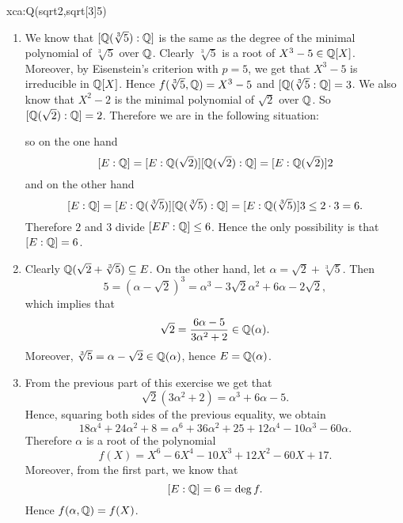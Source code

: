 \begin{sol}{xca:Q(sqrt2,sqrt[3]5)}\
    \begin{enumerate}
        \item      
        We know that $[\mathbb{Q}(\sqrt[3]{5}):\mathbb{Q}]$ is the same as
    the degree of the minimal polynomial of $\sqrt[3]{5}$
    over $\mathbb{Q}$.
    Clearly $\sqrt[3]{5}$ is a root of $X^3-5\in\mathbb{Q}[X]$.
    Moreover, by Eisenstein's criterion with
    $p=5$, we get that $X^3-5$ is irreducible in $\mathbb{Q}[X]$.
    Hence $f(\sqrt[3]{5},\mathbb{Q})=X^3-5$ and $[\mathbb{Q}(\sqrt[3]{5}:\mathbb{Q}]=3$.
    We also know that $X^2-2$ is the minimal polynomial of $\sqrt{2}$ over $\mathbb{Q}$. 
    So $[\mathbb{Q}(\sqrt{2}):\mathbb{Q}]=2$.
    Therefore we are in the following situation:
    \
    \begin{center}
    \end{center}
    so on the one hand
    \[
    [E:\mathbb{Q}]=[E:\mathbb{Q}(\sqrt{2})][\mathbb{Q}(\sqrt{2}):\mathbb{Q}]=[E:\mathbb{Q}(\sqrt{2})]2
    \]
    and on the other hand
    \[
    [E:\mathbb{Q}]=[E:\mathbb{Q}(\sqrt[3]{5})][\mathbb{Q}(\sqrt[3]{5}):\mathbb{Q}]=[E:\mathbb{Q}(\sqrt[3]{5})]3\leq 2\cdot 3=6.
    \]
    Therefore $2$ and $3$ divide $[EF:\mathbb{Q}]\leq 6$.
    Hence the only possibility is that $[E:\mathbb{Q}]=6$.
    \item Clearly $\mathbb{Q}(\sqrt{2}+\sqrt[3]{5})\subseteq E$.
    On the other hand, let $\alpha=\sqrt{2}+\sqrt[3]{5}$.
    Then 
    \[
    5=(\alpha-\sqrt{2})^3=\alpha^3-3\sqrt{2}\alpha^2+6\alpha-2\sqrt{2},
    \]
    which implies that 
    \[
    \sqrt{2}=\frac{6\alpha-5}{3\alpha^2+2}\in\mathbb{Q}(\alpha).
    \]
    Moreover, $\sqrt[3]{5}=\alpha-\sqrt{2}\in\mathbb{Q}(\alpha)$, hence $E=\mathbb{Q}(\alpha)$.
    \item From the previous part of this exercise
    we get that 
    \[
    \sqrt{2}(3\alpha^2+2)=\alpha^3+6\alpha-5.
    \]
    Hence, squaring both sides of the previous equality,
    we obtain
    \[
    18\alpha^4+24\alpha^2+8=\alpha^6+36\alpha^2+25+12\alpha^4-10\alpha^3-60\alpha.
    \]
    Therefore $\alpha$ is a root of the 
    polynomial 
    \[
    f(X)=X^6-6X^4-10X^3+12X^2-60X+17.
    \]
    Moreover, from the first part, we know that
    \[
    [E:\mathbb{Q}]=6=\deg f.
    \]
    Hence $f(\alpha,\mathbb{Q})=f(X)$.
    \end{enumerate}
\end{sol}

